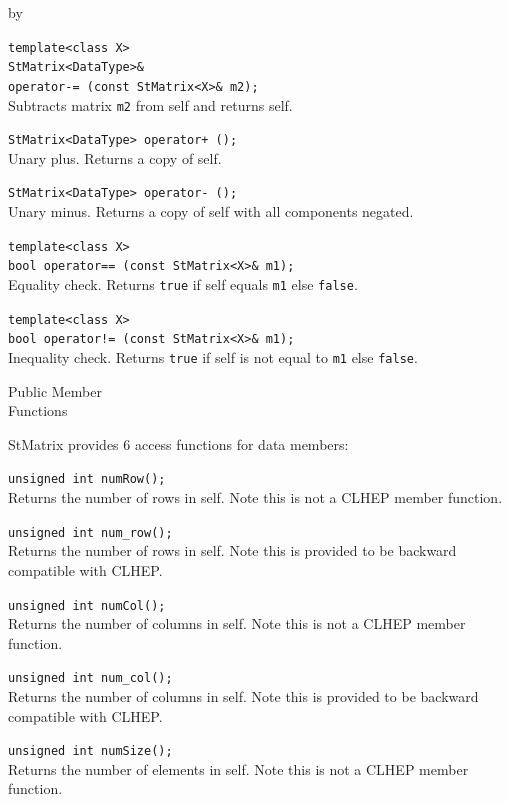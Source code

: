 \documentclass[twoside]{article}
\newcommand{\comp}[1]{\texttt{#1}}%
\newcommand{\entrylabel}[1]{\mbox{\textbf{{#1}}}\hfil}%
\newenvironment{entry}
{\begin{list}{}%
    {\renewcommand{\makelabel}{\entrylabel}%
     \setlength{\labelwidth}{90pt}%
     \setlength{\leftmargin}{\labelwidth}
     \advance\leftmargin by \labelsep%
      }%
    }%
  {\end{list}}
\newcommand{\Entrylabel}[1]%
{\raisebox{0pt}[1ex][0pt]{\makebox[\labelwidth][l]%
    {\parbox[t]{\labelwidth}{\hspace{0pt}\textbf{{#1}}}}}}
\newenvironment{Entry}%
{\renewcommand{\entrylabel}{\Entrylabel}\begin{entry}}%
  {\end{entry}}
\begin{document}
\begin{description}
\begin{Entry}
    \verb+template<class X>+\\
    \verb+StMatrix<DataType>&+\\
    \verb+operator-= (const StMatrix<X>& m2);+\\
    Subtracts matrix \comp{m2} from self and returns self.

    \verb#StMatrix<DataType> operator+ ();#\\
    Unary plus. Returns a copy of self.

    \verb+StMatrix<DataType> operator- ();+\\
    Unary minus. Returns a copy of self with all components negated.
        
    \verb+template<class X>+\\
    \verb+bool operator== (const StMatrix<X>& m1);+\\
    Equality check. Returns \comp{true} if self equals
    \comp{m1} else \comp{false}.
    
    \verb+template<class X>+\\
    \verb+bool operator!= (const StMatrix<X>& m1);+\\
    Inequality check. Returns \comp{true} if self is not equal to
    \comp{m1} else \comp{false}.
    
\item[Public Member\\ Functions]

  StMatrix provides 6 access functions for data members:
  
  \verb+unsigned int numRow();+\\
  Returns the number of rows in self.  Note this is
  not a CLHEP member function.

  \verb+unsigned int num_row();+\\
  Returns the number of rows in self.  Note this is
  provided to be backward compatible with CLHEP.

  \verb+unsigned int numCol();+\\
  Returns the number of columns in self.  Note this is
  not a CLHEP member function.

  \verb+unsigned int num_col();+\\
  Returns the number of columns in self.  Note this is
  provided to be backward compatible with CLHEP.

  \verb+unsigned int numSize();+\\
  Returns the number of elements in self.  Note this is
  not a CLHEP member function.
  

\end{Entry}
\end{description}
\end{document}
